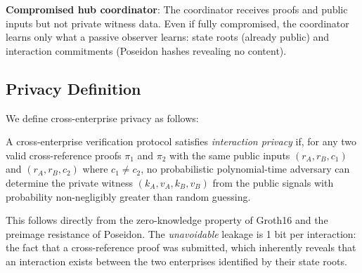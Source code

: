 \textbf{Compromised hub coordinator}: The coordinator receives proofs and
public inputs but not private witness data. Even if fully compromised, the
coordinator learns only what a passive observer learns: state roots (already
public) and interaction commitments (Poseidon hashes revealing no content).

\subsection{Privacy Definition}

We define cross-enterprise privacy as follows:

\begin{definition}
A cross-enterprise verification protocol satisfies \emph{interaction privacy}
if, for any two valid cross-reference proofs $\pi_1$ and $\pi_2$ with the
same public inputs $(r_A, r_B, c_1)$ and $(r_A, r_B, c_2)$ where $c_1 \neq
c_2$, no probabilistic polynomial-time adversary can determine the private
witness $(k_A, v_A, k_B, v_B)$ from the public signals with probability
non-negligibly greater than random guessing.
\end{definition}

This follows directly from the zero-knowledge property of Groth16 and the
preimage resistance of Poseidon. The \emph{unavoidable} leakage is 1 bit per
interaction: the fact that a cross-reference proof was submitted, which
inherently reveals that an interaction exists between the two enterprises
identified by their state roots.
